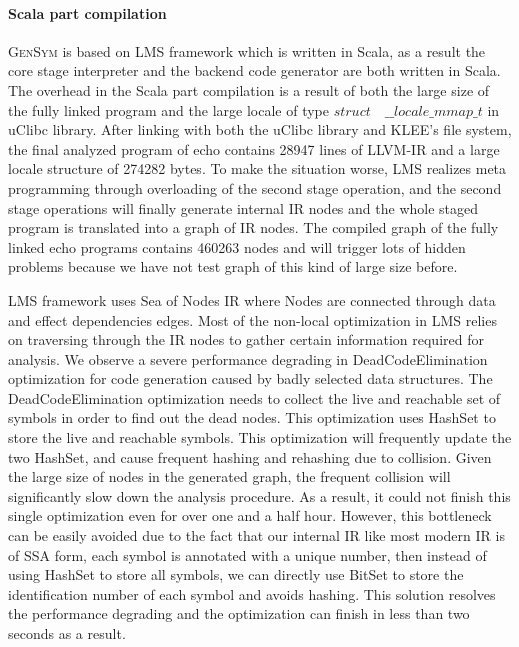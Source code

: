 \documentclass[sigplan, nonacm]{acmart}\settopmatter{printfolios=true,printccs=false,printacmref=false}
\newcommand{\tool}{\textsc{GenSym}\xspace}
\begin{document}
\paragraph*{Scala part compilation}
\tool is based on LMS framework which is written in Scala, as a result the core stage interpreter and the backend code generator are both written in Scala. The overhead in the Scala part compilation is a result of both the large size of the fully linked program and the large locale of type $struct \quad \_ \_ locale \_ mmap \_ t$ in uClibc library. After linking with both the uClibc library and KLEE's file system, the final analyzed program of echo contains 28947 lines of LLVM-IR and a large locale structure of 274282 bytes. To make the situation worse, LMS realizes meta programming through overloading of the second stage operation, and the second stage operations will finally generate internal IR nodes and the whole staged program is translated into a graph of IR nodes. The compiled graph of the fully linked echo programs contains 460263 nodes and will trigger lots of hidden problems because we have not test graph of this kind of large size before. \par
LMS framework uses Sea of Nodes IR where Nodes are connected through data and effect dependencies edges. Most of the non-local optimization in LMS relies on traversing through the IR nodes to gather certain information required for analysis. We observe a severe performance degrading in DeadCodeElimination optimization for code generation caused by badly selected data structures. The DeadCodeElimination optimization needs to collect the live and reachable set of symbols in order to find out the dead nodes. This optimization uses HashSet to store the live and reachable symbols. This optimization will frequently update the two HashSet, and cause frequent hashing and rehashing due to collision. Given the large size of nodes in the generated graph, the frequent collision will significantly slow down the analysis procedure. As a result, it could not finish this single optimization even for over one and a half hour. However, this bottleneck can be easily avoided due to the fact that our internal IR like most modern IR is of SSA form, each symbol is annotated with a unique number, then instead of using HashSet to store all symbols, we can directly use BitSet to store the identification number of each symbol and avoids hashing. This solution resolves the performance degrading and the optimization can finish in less than two seconds as a result.\par
\end{document}
